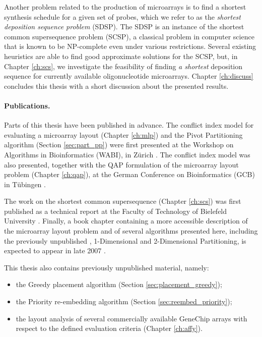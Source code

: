 Another problem related to the production of microarrays is to find a shortest
synthesis schedule for a given set of probes, which we refer to as the
\emph{shortest deposition sequence problem} (SDSP). The SDSP is an instance of
the shortest common supersequence problem (SCSP), a classical problem in
computer science that is known to be NP-complete even under various
restrictions. Several existing heuristics are able to find good approximate
solutions for the SCSP, but, in Chapter \ref{ch:scs}, we investigate the
feasibility of finding \emph{a shortest} deposition sequence for currently
available oligonucleotide microarrays. Chapter \ref{ch:discuss} concludes this
thesis with a short discussion about the presented results.

\paragraph{Publications.}
Parts of this thesis have been published in advance. The conflict index model
for evaluating a microarray layout (Chapter \ref{ch:mlp}) and the Pivot
Partitioning algorithm (Section \ref{sec:part_pp}) were first presented at the
Workshop on Algorithms in Bioinformatics (WABI), in Z\"urich
\citep{Carvalho2006}. The conflict index model was also presented, together with
the QAP formulation of the microarray layout problem (Chapter \ref{ch:qap}), at
the German Conference on Bioinformatics (GCB) in T\"ubingen
\citep{Carvalho2006a}.

The work on the shortest common supersequence (Chapter \ref{ch:scs}) was first
published as a technical report at the Faculty of Technology of Bielefeld
University \citep{Carvalho2005}. Finally, a book chapter containing a more
accessible description of the microarray layout problem and of several
algorithms presented here, including the previously unpublished \Greedyplus,
1-Dimensional and 2-Dimensional Partitioning, is expected to appear in late 2007
\citep{Carvalho2007}.

This thesis also contains previously unpublished material, namely:
\begin{itemize}
\item the Greedy placement algorithm (Section \ref{sec:placement_greedy});
\item the Priority re-embedding algorithm (Section \ref{sec:reembed_priority});
\item the layout analysis of several commercially available GeneChip arrays with
      respect to the defined evaluation criteria (Chapter \ref{ch:affy}).
\end{itemize}

